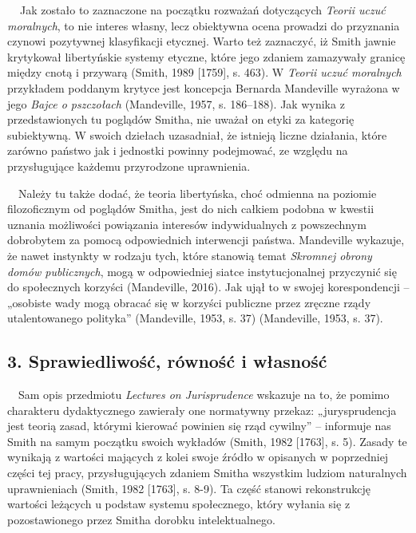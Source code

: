 \documentclass[a4paper]{article}
\begin{document}
\textbf{\ \ }Jak zostało to zaznaczone na początku rozważań dotyczących \textit{Teorii uczuć moralnych}, to nie interes
własny, lecz obiektywna ocena prowadzi do przyznania czynowi pozytywnej klasyfikacji etycznej. Warto też zaznaczyć, iż
Smith jawnie krytykował libertyńskie systemy etyczne, które jego zdaniem zamazywały granicę między cnotą i przywarą
\label{ref:RND6UVhftNekE}(Smith, 1989 [1759], s. 463). W \textit{Teorii uczuć moralnych} przykładem poddanym krytyce
jest koncepcja Bernarda Mandeville wyrażona w jego \textit{Bajce o pszczołach }\label{ref:RNDhsq78lJp7f}(Mandeville,
1957, s. 186–188). Jak wynika z przedstawionych tu poglądów Smitha, nie uważał on etyki za kategorię subiektywną. W
swoich dziełach uzasadniał, że istnieją liczne działania, które zarówno państwo jak i jednostki powinny podejmować, ze
względu na przysługujące każdemu przyrodzone uprawnienia.

 \ \ Należy tu także dodać, że teoria libertyńska, choć odmienna na poziomie filozoficznym od poglądów Smitha, jest do
nich całkiem podobna w kwestii uznania możliwości powiązania interesów indywidualnych z powszechnym dobrobytem za
pomocą odpowiednich interwencji państwa. Mandeville wykazuje, że nawet instynkty w rodzaju tych, które stanowią temat
\textit{Skromnej obrony domów publicznych}, mogą w odpowiedniej siatce instytucjonalnej przyczynić się do społecznych
korzyści \label{ref:RNDKGiGp2VVGh}(Mandeville, 2016). Jak ujął to w swojej korespondencji – „osobiste wady mogą obracać
się w korzyści publiczne przez zręczne rządy utalentowanego polityka” \label{ref:RNDFxtQ9hz1QF}(Mandeville, 1953, s.
37) (Mandeville, 1953, s. 37). 

\subsection[3. Sprawiedliwość, równość i własność]{3. Sprawiedliwość, równość i własność}
\ \ Sam opis przedmiotu \textit{Lectures on Jurisprudence} wskazuje na to, że pomimo charakteru dydaktycznego zawierały
one normatywny przekaz: „jurysprudencja jest teorią zasad, którymi kierować powinien się rząd cywilny” – informuje nas
Smith na samym początku swoich wykładów \label{ref:RNDscYVjbho0w}(Smith, 1982 [1763], s. 5). Zasady te wynikają z
wartości mających z kolei swoje źródło w opisanych w poprzedniej części tej pracy, przysługujących zdaniem Smitha
wszystkim ludziom naturalnych uprawnieniach \label{ref:RND2YqiGCGi5H}(Smith, 1982 [1763], s. 8-9). Ta część stanowi
rekonstrukcję wartości leżących u podstaw systemu społecznego, który wyłania się z pozostawionego przez Smitha dorobku
intelektualnego.
\end{document}
